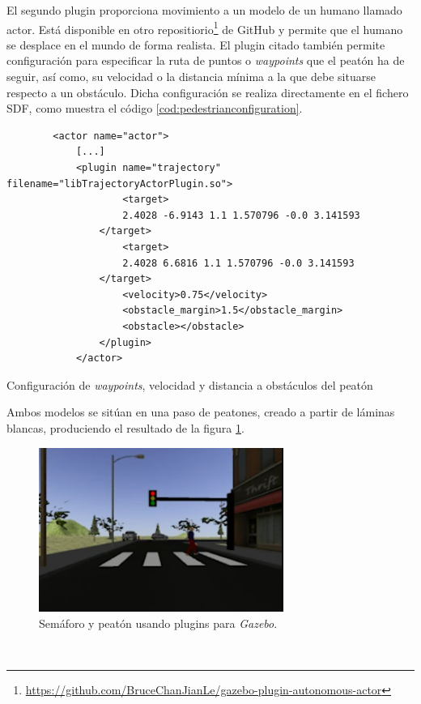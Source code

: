 El segundo plugin proporciona movimiento a un modelo de un humano llamado actor. Está disponible en otro repositiorio\footnote{\url{https://github.com/BruceChanJianLe/gazebo-plugin-autonomous-actor}} de GitHub y permite que el humano se desplace en el mundo de forma realista. El plugin citado también permite configuración para especificar la ruta de puntos o \textit{waypoints} que el peatón ha de seguir, así como, su velocidad o la distancia mínima a la que debe situarse respecto a un obstáculo. Dicha configuración se realiza directamente en el fichero SDF, como muestra el código \ref{cod:pedestrianconfiguration}.\\

\begin{code}[h]
	\begin{lstlisting}
		<actor name="actor">
			[...]
			<plugin name="trajectory" filename="libTrajectoryActorPlugin.so">
					<target>
					2.4028 -6.9143 1.1 1.570796 -0.0 3.141593
				</target>
					<target>
					2.4028 6.6816 1.1 1.570796 -0.0 3.141593
				</target>
					<velocity>0.75</velocity>
					<obstacle_margin>1.5</obstacle_margin>
					<obstacle></obstacle>
				</plugin>
			</actor>
	\end{lstlisting}
	\caption[Configuración de \textit{waypoints}, velocidad y distancia a obstáculos del peatón]{Configuración de \textit{waypoints}, velocidad y distancia a obstáculos del peatón}
	\label{cod:pedestrianconfiguration}
\end{code}

Ambos modelos se sitúan en una paso de peatones, creado a partir de láminas blancas, produciendo el resultado de la figura \ref{fig:trafficlightpedestrian}.\\

\begin{figure} [h!]
	\begin{center}
		\includegraphics[width=8cm]{figs/trafficlightpedestrian}
	\end{center}
	\caption{Semáforo y peatón usando plugins para \textit{Gazebo}.}
	\label{fig:trafficlightpedestrian}
\end{figure}\


